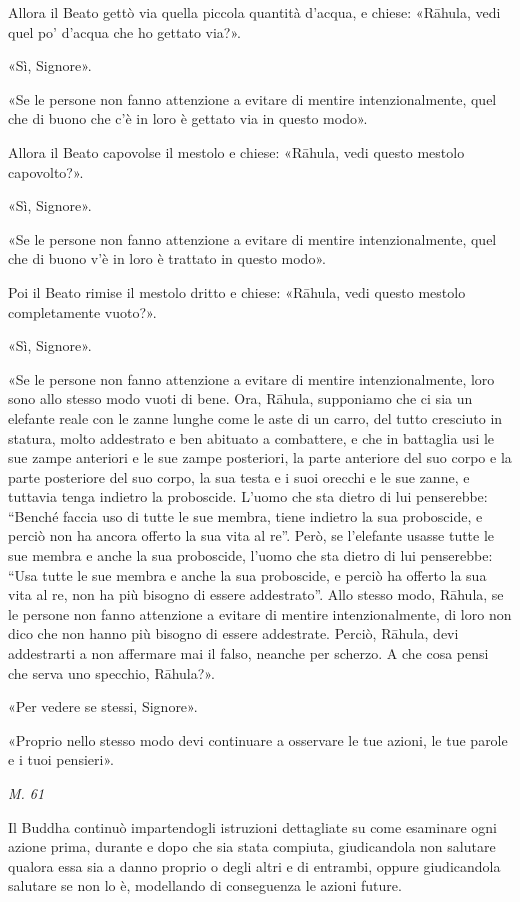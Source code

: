 Allora il Beato gettò via quella piccola quantità d’acqua, e chiese:
«Rāhula, vedi quel po’ d’acqua che ho gettato via?».


«Sì, Signore».


«Se le persone non fanno attenzione a evitare di mentire
intenzionalmente, quel che di buono che c’è in loro è gettato via in
questo modo».


Allora il Beato capovolse il mestolo e chiese: «Rāhula, vedi questo
mestolo capovolto?».


«Sì, Signore».


«Se le persone non fanno attenzione a evitare di mentire
intenzionalmente, quel che di buono v’è in loro è trattato in questo
modo».


Poi il Beato rimise il mestolo dritto e chiese: «Rāhula, vedi questo
mestolo completamente vuoto?».


«Sì, Signore».


«Se le persone non fanno attenzione a evitare di mentire
intenzionalmente, loro sono allo stesso modo vuoti di bene. Ora, Rāhula,
supponiamo che ci sia un elefante reale con le zanne lunghe come le aste
di un carro, del tutto cresciuto in statura, molto addestrato e ben
abituato a combattere, e che in battaglia usi le sue zampe anteriori e
le sue zampe posteriori, la parte anteriore del suo corpo e la parte
posteriore del suo corpo, la sua testa e i suoi orecchi e le sue zanne,
e tuttavia tenga indietro la proboscide. L’uomo che sta dietro di lui
penserebbe: “Benché faccia uso di tutte le sue membra, tiene indietro la
sua proboscide, e perciò non ha ancora offerto la sua vita al re”. Però,
se l’elefante usasse tutte le sue membra e anche la sua proboscide,
l’uomo che sta dietro di lui penserebbe: “Usa tutte le sue membra e
anche la sua proboscide, e perciò ha offerto la sua vita al re, non ha
più bisogno di essere addestrato”. Allo stesso modo, Rāhula, se le
persone non fanno attenzione a evitare di mentire intenzionalmente, di
loro non dico che non hanno più bisogno di essere addestrate. Perciò,
Rāhula, devi addestrarti a non affermare mai il falso, neanche per
scherzo. A che cosa pensi che serva uno specchio, Rāhula?».


«Per vedere se stessi, Signore».


«Proprio nello stesso modo devi continuare a osservare le tue azioni, le
tue parole e i tuoi pensieri».


\emph{M. 61}


 Il Buddha continuò impartendogli istruzioni
dettagliate su come esaminare ogni azione prima, durante e dopo che sia
stata compiuta, giudicandola non salutare qualora essa sia a danno
proprio o degli altri e di entrambi, oppure giudicandola salutare se non
lo è, modellando di conseguenza le azioni future.



